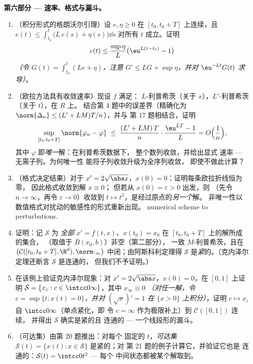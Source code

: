 \begin{problem}[{周末问题 --- 无利普希茨条件时
$x' = f(t, x)$ 解的存在性}]
\medskip
\noindent\textbf{第六部分 --- 速率、格式与漏斗。}
\begin{enumerate}[resume]
  \item （积分形式的格朗沃尔引理）设 $e, \eta \geq 0$ 在
        $[t_0, t_0+T]$ 上连续，且 $e(t) \leq \int_{t_0}
        ^t\bigl(L\,e(s) + \eta(s)\bigr)\dd s$ 对所有 $t$ 成立。证明
        \[
        e(t) \leq \frac{\sup\eta}{L}\bigl(\eu^{L(t - t_0)} -
        1\bigr)
        \]
        \emph{（令 $G(t) = \int_{t_0}^t(Le + \eta)$，注意 $G'
        \leq LG + \sup\eta$，并对
        $\eu^{-Lt}G(t)$ 求导）}。
  \item （欧拉方法具有收敛速率）现设 $f$ 满足：
        $L$-利普希茨（关于 $x$），$L'$-利普希茨（关于 $t$），在 $R$ 上。
        结合第 4 题中的误差界（精确化为
        $\norm{\Delta_n} \leq (L' + LM)T/n$），并与
        第 17 题相结合，证明
        \[
        \sup_{[t_0, t_0+T]}\norm{\varphi_n - \varphi}
        \;\leq\; \frac{(L' + LM)\,T}{n}\cdot
        \frac{\eu^{LT} - 1}{L} = O\Bigl(\frac1n\Bigr),
        \]
        其中 $\varphi$ 即\emph{唯一}解：在利普希茨数据下，
        整个数列收敛，并给出显式
        速率 --- 无需子列。为何唯一性
        能将子列收敛升级为全序列收敛，
        即使不做此计算？
  \item （格式决定结果）对于 $x' = 2\sqrt{\abs x}$，$x(0) =
        0$：证明每条欧拉折线恒为零，
        因此格式收敛到解 $x \equiv 0$；
        但若从 $x(0) = \varepsilon > 0$ 出发，则
        （先令 $n \to \infty$，再令 $\varepsilon \to 0$）收敛到 $t
        \mapsto t^2$，是经过原点的\emph{另一个}解。
        非唯一性以数值格式对扰动的敏感性的形式重新出现。
        numerical scheme to perturbations.
  \item 证明：记 $\mathcal S$ 为 \emph{全部}
        $x' = f(t,x)$、$x(t_0) = x_0$ 在 $[t_0, t_0+T]$ 上的解所成的集合，
        （取值于 $\bar B(x_0, b)$）非空（第二部分），
        一致 $M$-利普希茨，且在
        $\bigl(\mathcal C([t_0, t_0+T], \R^d),
        \norm\cdot_\infty\bigr)$ 中闭；由阿斯科利定理得
        $\mathcal S$ 是\emph{紧}的。（克内泽尔定理还断言
        $\mathcal S$ 是连通的，
        但我们不予证明。）
  \item 在该例上验证克内泽尔现象：对 $x' =
        2\sqrt{\abs x}$，$x(0) = 0$，在 $[0, 1]$ 上证明
        $\mathcal S = \{x_c : c \in \intcc0\infty\}$，其中
        $x_\infty \equiv 0$ \emph{（对任一解，令 $c =
        \sup\{t : x(t) = 0\}$，并对 $(\sqrt x)' = 1$ 在
        $\{x > 0\}$ 上积分）}，证明 $c \mapsto x_c$ 自
        $\intcc0\infty$（单点紧化，即
        令 $c = \infty$ 作为极限补上）到 $\mathcal C([0,1])$ 连续，
        并得出 $\mathcal S$ 确实是紧的且
        连通的 --- 一个线段形的漏斗。
  \item （可达集）由第 20 题推出：对每个
        固定的 $t$，\emph{可达集} $\mathcal S(t) =
        \{x(t) : x \in \mathcal S\}$ 是紧的；对
        第 21 题的例子计算它，并验证它也是
        连通的：$\mathcal S(t) = \intcc0{t^2}$ --- 每个
        中间状态都被某个解取到。
\end{enumerate}


\end{problem}

